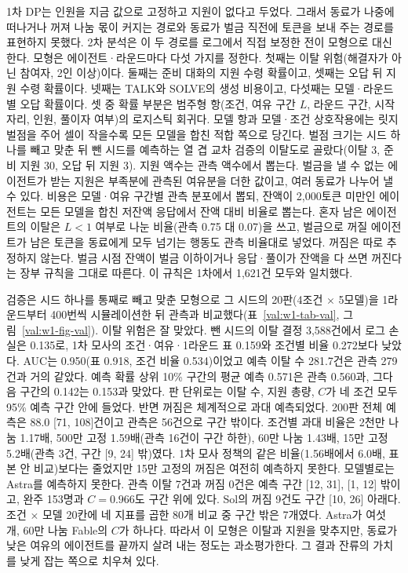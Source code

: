 1차 DP는 인원을 지금 값으로 고정하고 지원이 없다고 두었다. 그래서 동료가 나중에 떠나거나 꺼져 나눔 몫이 커지는 경로와 동료가 벌금 직전에 토큰을 보내 주는 경로를 표현하지 못했다. 2차 분석은 이 두 경로를 로그에서 직접 보정한 전이 모형으로 대신한다. 모형은 에이전트·라운드마다 다섯 가지를 정한다. 첫째는 이탈 위험(해결자가 아닌 참여자, 2인 이상)이다. 둘째는 준비 대화의 지원 수령 확률이고, 셋째는 오답 뒤 지원 수령 확률이다. 넷째는 TALK와 SOLVE의 생성 비용이고, 다섯째는 모델·라운드별 오답 확률이다. 셋 중 확률 부분은 범주형 항(조건, 여유 구간 $L$, 라운드 구간, 시작 자리, 인원, 풀이자 여부)의 로지스틱 회귀다. 모델 항과 모델·조건 상호작용에는 릿지 벌점을 주어 셀이 작을수록 모든 모델을 합친 적합 쪽으로 당긴다. 벌점 크기는 시드 하나를 빼고 맞춘 뒤 뺀 시드를 예측하는 열 겹 교차 검증의 이탈도로 골랐다(이탈 3, 준비 지원 30, 오답 뒤 지원 3). 지원 액수는 관측 액수에서 뽑는다. 벌금을 낼 수 없는 에이전트가 받는 지원은 부족분에 관측된 여유분을 더한 값이고, 여러 동료가 나누어 낼 수 있다. 비용은 모델·여유 구간별 관측 분포에서 뽑되, 잔액이 2,000토큰 미만인 에이전트는 모든 모델을 합친 저잔액 응답에서 잔액 대비 비율로 뽑는다. 혼자 남은 에이전트의 이탈은 $L<1$ 여부로 나눈 비율(관측 0.75 대 0.07)을 쓰고, 벌금으로 꺼질 에이전트가 남은 토큰을 동료에게 모두 넘기는 행동도 관측 비율대로 넣었다. 꺼짐은 따로 추정하지 않는다. 벌금 시점 잔액이 벌금 이하이거나 응답·풀이가 잔액을 다 쓰면 꺼진다는 장부 규칙을 그대로 따른다. 이 규칙은 1차에서 1,621건 모두와 일치했다.

검증은 시드 하나를 통째로 빼고 맞춘 모형으로 그 시드의 20판(4조건 $\times$ 5모델)을 1라운드부터 400번씩 시뮬레이션한 뒤 관측과 비교했다(표~\ref{val:w1-tab-val}, 그림~\ref{val:w1-fig-val}). 이탈 위험은 잘 맞았다. 뺀 시드의 이탈 결정 3,588건에서 로그 손실은 0.135로, 1차 모사의 조건·여유·1라운드 표 0.159와 조건별 비율 0.272보다 낮았다. AUC는 0.950(표 0.918, 조건 비율 0.534)이었고 예측 이탈 수 281.7건은 관측 279건과 거의 같았다. 예측 확률 상위 10\% 구간의 평균 예측 0.571은 관측 0.560과, 그다음 구간의 0.142는 0.153과 맞았다. 판 단위로는 이탈 수, 지원 총량, $C$가 네 조건 모두 95\% 예측 구간 안에 들었다. 반면 꺼짐은 체계적으로 과대 예측되었다. 200판 전체 예측은 88.0 [71, 108]건이고 관측은 56건으로 구간 밖이다. 조건별 과대 비율은 2천만 나눔 1.17배, 500만 고정 1.59배(관측 16건이 구간 하한), 60만 나눔 1.43배, 15만 고정 5.2배(관측 3건, 구간 [9, 24] 밖)였다. 1차 모사 정책의 같은 비율(1.56배에서 6.0배, 표본 안 비교)보다는 줄었지만 15만 고정의 꺼짐은 여전히 예측하지 못한다. 모델별로는 Astra를 예측하지 못한다. 관측 이탈 7건과 꺼짐 0건은 예측 구간 [12, 31], [1, 12] 밖이고, 완주 153명과 $C=0.966$도 구간 위에 있다. Sol의 꺼짐 9건도 구간 [10, 26] 아래다. 조건 $\times$ 모델 20칸에 네 지표를 곱한 80개 비교 중 구간 밖은 7개였다. Astra가 여섯 개, 60만 나눔 Fable의 $C$가 하나다. 따라서 이 모형은 이탈과 지원을 맞추지만, 동료가 낮은 여유의 에이전트를 끝까지 살려 내는 정도는 과소평가한다. 그 결과 잔류의 가치를 낮게 잡는 쪽으로 치우쳐 있다.

